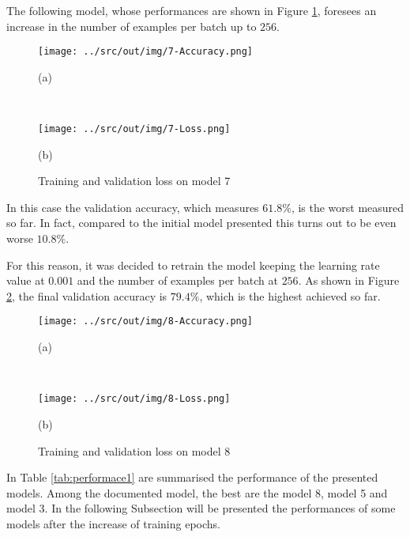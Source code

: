 \documentclass[a4paper,12pt]{article} %
\begin{document}
	The following model, whose performances are shown in Figure 
	\ref{fig:model7-performance}, foresees an increase in the number of 
	examples per batch up to $256$.
	
	\begin{figure}[H]
		\begin{minipage}[c]{.49\textwidth}
			\centering
			\texttt{[image: ../src/out/img/7-Accuracy.png]}
			\caption*{(a)}
		\end{minipage}
		~
		\begin{minipage}[c]{.49\textwidth}
			\centering
			\texttt{[image: ../src/out/img/7-Loss.png]}
			\caption*{(b)}
		\end{minipage}
		\caption{Training and validation loss on model 7}
		\label{fig:model7-performance}
	\end{figure}
	In this case the validation accuracy, which measures $61.8\%$, is the worst 
	measured so far. In fact, compared to the initial model presented this 
	turns out to be even worse $10.8\%$. 
	
	For this reason, it was decided to retrain the model keeping the learning 
	rate value at $0.001$ and the number of examples per batch at $256$.
	As shown in Figure \ref{fig:model8-performance}, the final validation 
	accuracy is $79.4\%$, which is the highest achieved so far.
	
	\begin{figure}[htb]
		\begin{minipage}[c]{.49\textwidth}
			\centering
			\texttt{[image: ../src/out/img/8-Accuracy.png]}
			\caption*{(a)}
		\end{minipage}
		~
		\begin{minipage}[c]{.49\textwidth}
			\centering
			\texttt{[image: ../src/out/img/8-Loss.png]}
			\caption*{(b)}
		\end{minipage}
		\caption{Training and validation loss on model 8}
		\label{fig:model8-performance}
	\end{figure}

	In Table \ref{tab:performace1} are summarised the performance of the 
	presented models. Among the documented model, the best are the model 8, 
	model 5 and model 3. 
	In the following Subsection will be presented the performances of some 
	models after the increase of training epochs.
	
\end{document}
